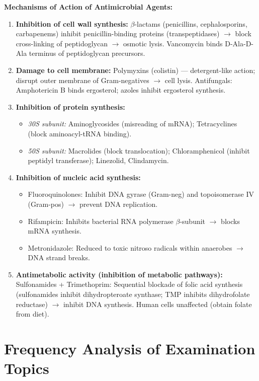 \documentclass[11pt,a4paper]{article}
\begin{document}
\begin{ansbox}
\textbf{Mechanisms of Action of Antimicrobial Agents:}
\begin{enumerate}[leftmargin=*]
    \item \textbf{Inhibition of cell wall synthesis:} $\beta$-lactams (penicillins, cephalosporins, carbapenems) inhibit penicillin-binding proteins (transpeptidases) $\rightarrow$ block cross-linking of peptidoglycan $\rightarrow$ osmotic lysis. Vancomycin binds D-Ala-D-Ala terminus of peptidoglycan precursors.
    \item \textbf{Damage to cell membrane:} Polymyxins (colistin) — detergent-like action; disrupt outer membrane of Gram-negatives $\rightarrow$ cell lysis. Antifungals: Amphotericin B binds ergosterol; azoles inhibit ergosterol synthesis.
    \item \textbf{Inhibition of protein synthesis:}
    \begin{itemize}
        \item \textit{30S subunit:} Aminoglycosides (misreading of mRNA); Tetracyclines (block aminoacyl-tRNA binding).
        \item \textit{50S subunit:} Macrolides (block translocation); Chloramphenicol (inhibit peptidyl transferase); Linezolid, Clindamycin.
    \end{itemize}
    \item \textbf{Inhibition of nucleic acid synthesis:}
    \begin{itemize}
        \item Fluoroquinolones: Inhibit DNA gyrase (Gram-neg) and topoisomerase IV (Gram-pos) $\rightarrow$ prevent DNA replication.
        \item Rifampicin: Inhibits bacterial RNA polymerase $\beta$-subunit $\rightarrow$ blocks mRNA synthesis.
        \item Metronidazole: Reduced to toxic nitroso radicals within anaerobes $\rightarrow$ DNA strand breaks.
    \end{itemize}
    \item \textbf{Antimetabolic activity (inhibition of metabolic pathways):} Sulfonamides + Trimethoprim: Sequential blockade of folic acid synthesis (sulfonamides inhibit dihydropteroate synthase; TMP inhibits dihydrofolate reductase) $\rightarrow$ inhibit DNA synthesis. Human cells unaffected (obtain folate from diet).
\end{enumerate}
\end{ansbox}

\section{Frequency Analysis of Examination Topics}
\end{document}
